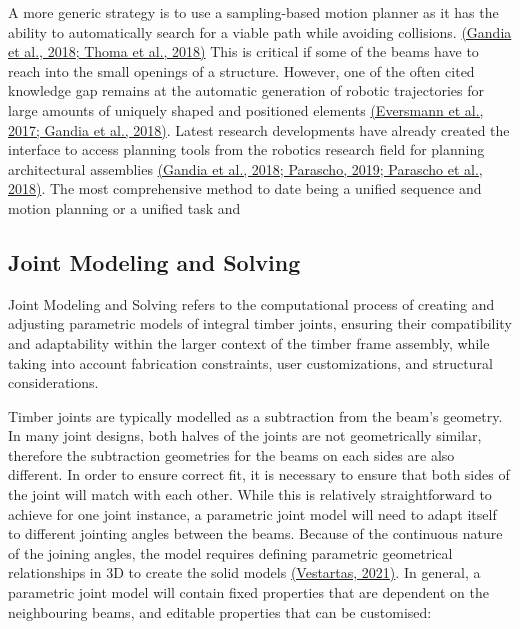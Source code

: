 A more generic strategy is to use a sampling-based motion planner as it has the ability to automatically search for a viable path while avoiding collisions. \href{https://www.zotero.org/google-docs/?wxRkWx}{(Gandia et al., 2018; Thoma et al., 2018)} This is critical if some of the beams have to reach into the small openings of a structure. However, one of the often cited knowledge gap remains at the automatic generation of robotic trajectories for large amounts of uniquely shaped and positioned elements \href{https://www.zotero.org/google-docs/?COr7LA}{(Eversmann et al., 2017; Gandia et al., 2018)}. Latest research developments have already created the interface to access planning tools from the robotics research field for planning architectural assemblies \href{https://www.zotero.org/google-docs/?LW23oL}{(Gandia et al., 2018; Parascho, 2019; Parascho et al., 2018)}. The most comprehensive method to date being a unified sequence and motion planning or a unified task and 

\subsection{Joint Modeling and Solving}

Joint Modeling and Solving refers to the computational process of creating and adjusting parametric models of integral timber joints, ensuring their compatibility and adaptability within the larger context of the timber frame assembly, while taking into account fabrication constraints, user customizations, and structural considerations.

Timber joints are typically modelled as a subtraction from the beam’s geometry. In many joint designs, both halves of the joints are not geometrically similar, therefore the subtraction geometries for the beams on each sides are also different. In order to ensure correct fit, it is necessary to ensure that both sides of the joint will match with each other. While this is relatively straightforward to achieve for one joint instance, a parametric joint model will need to adapt itself to different jointing angles between the beams. Because of the continuous nature of the joining angles, the model requires defining parametric geometrical relationships in 3D to create the solid models \href{https://www.zotero.org/google-docs/?Ix4BkB}{(Vestartas, 2021)}. In general, a parametric joint model will contain fixed properties that are dependent on the neighbouring beams, and editable properties that can be customised:


